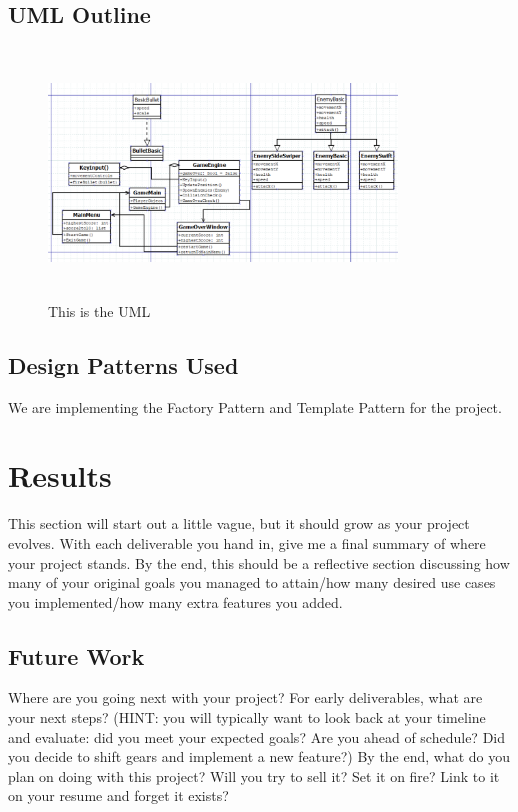 \documentclass[10pt,conference,onecolumn,compsoc]{IEEEtran}
\begin{document}
\subsection{UML Outline}
\begin{figure}[ht!]
\includegraphics[height=250px, width=350px]{DIA.png}
\caption{This is the UML}
\label{cat2}
\end{figure}

\subsection{Design Patterns Used}
We are implementing the Factory Pattern and Template Pattern for the project.


\section{Results}
This section will start out a little vague, but it should grow as your project evolves.  With each deliverable you hand in, give me a final summary of where your project stands.  By the end, this should be a reflective section discussing how many of your original goals you managed to attain/how many desired use cases you implemented/how many extra features you added.

\subsection{Future Work}
Where are you going next with your project?
For early deliverables, what are your next steps?  (HINT: you will typically want to look back at your timeline and evaluate: did you meet your expected goals?  Are you ahead of schedule?  Did you decide to shift gears and implement a new feature?)
By the end, what do you plan on doing with this project?  Will you try to sell it?  Set it on fire?  Link to it on your resume and forget it exists?
\end{document}
